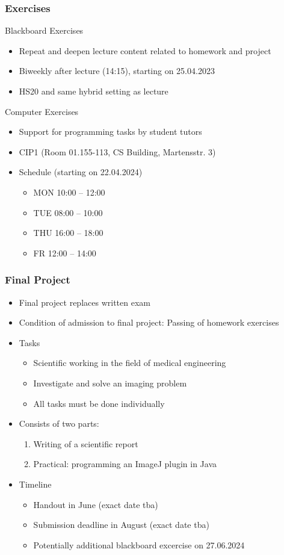 \begin{frame}
	\frametitle{Exercises}
	\begin{block}{Blackboard Exercises}
		\begin{itemize}
			\item Repeat and deepen lecture content related to homework and project
			\item Biweekly after lecture (14:15), starting on 25.04.2023
			\item HS20 and same hybrid setting as lecture
		\end{itemize}
	\end{block}
	\begin{block}{Computer Exercises}
		\begin{itemize}
			\item Support for programming tasks by student tutors
			\item CIP1 (Room 01.155-113, CS Building, Martensstr. 3)
			\item Schedule (starting on 22.04.2024)
			\begin{itemize}
				\item MON 10:00 -- 12:00
				\item TUE 08:00 -- 10:00
				\item THU 16:00 -- 18:00
				\item FR 12:00 -- 14:00
			\end{itemize}
		\end{itemize}
	\end{block}
\end{frame}

\begin{frame}
	\frametitle{Final Project}
	\begin{itemize}
		\item Final project replaces written exam
		\item Condition of admission to final project: Passing of homework exercises
		\item Tasks
		\begin{itemize}
			\item Scientific working in the field of medical engineering
			\item Investigate and solve an imaging problem
			\item All tasks must be done individually
		\end{itemize}
		\item Consists of two parts:
		\begin{enumerate}
			\item Writing of a scientific report
			\item Practical: programming an ImageJ plugin in Java
		\end{enumerate}
		\item Timeline
		\begin{itemize}
			\item Handout in June (exact date tba)
			\item Submission deadline in August (exact date tba)
			\item Potentially additional blackboard excercise on 27.06.2024
		\end{itemize}
	\end{itemize}
\end{frame}

